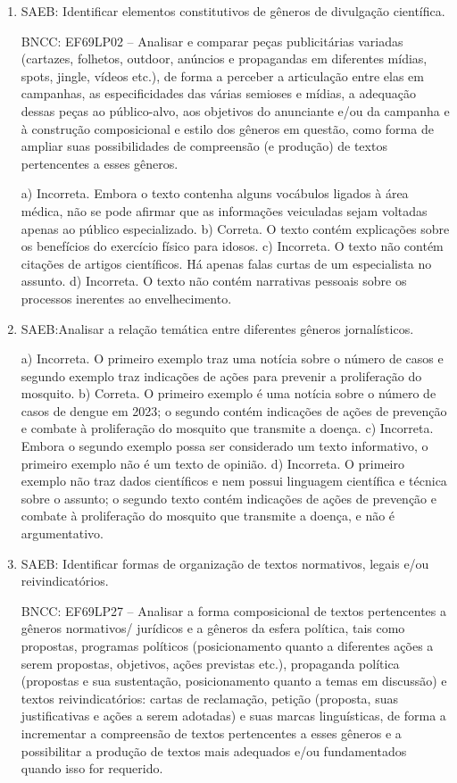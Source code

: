 \begin{enumerate}

\item
SAEB: Identificar elementos constitutivos de gêneros de divulgação
científica.

BNCC: EF69LP02 -- Analisar e comparar peças publicitárias variadas
(cartazes, folhetos, outdoor, anúncios e propagandas em diferentes
mídias, spots, jingle, vídeos etc.), de forma a perceber a articulação
entre elas em campanhas, as especificidades das várias semioses e
mídias, a adequação dessas peças ao público-alvo, aos objetivos do
anunciante e/ou da campanha e à construção composicional e estilo dos
gêneros em questão, como forma de ampliar suas possibilidades de
compreensão (e produção) de textos pertencentes a esses gêneros.

a) Incorreta. Embora o texto contenha alguns vocábulos ligados à área médica, não se pode 
afirmar que as informações veiculadas sejam voltadas apenas ao público especializado.
b) Correta. O texto contém explicações sobre os benefícios do exercício físico para idosos.
c) Incorreta. O texto não contém citações de artigos científicos. Há apenas falas curtas de um
especialista no assunto.
d) Incorreta. O texto não contém narrativas pessoais sobre os processos inerentes ao envelhecimento.

\item
SAEB:Analisar a relação temática entre diferentes gêneros jornalísticos.

a) Incorreta. O primeiro exemplo traz uma notícia sobre o número de casos
e segundo exemplo traz indicações de ações para prevenir a
proliferação do mosquito.
b) Correta. O primeiro exemplo é uma
notícia sobre o número de casos de dengue em 2023; o segundo contém
indicações de ações de prevenção e combate à proliferação do
mosquito que transmite a doença.
c) Incorreta. Embora o segundo exemplo possa ser considerado um texto
informativo, o primeiro exemplo não é um texto de opinião.
d) Incorreta. O primeiro exemplo não traz dados científicos e nem possui
linguagem científica e técnica sobre o assunto; o segundo texto contém
indicações de ações de prevenção e combate à proliferação do
mosquito que transmite a doença, e não é
argumentativo.

\item
SAEB: Identificar formas de organização de textos normativos, legais
e/ou reivindicatórios.

BNCC: EF69LP27 -- Analisar a forma composicional de textos
pertencentes a gêneros normativos/ jurídicos e a gêneros da esfera
política, tais como propostas, programas políticos (posicionamento
quanto a diferentes ações a serem propostas, objetivos, ações previstas
etc.), propaganda política (propostas e sua sustentação, posicionamento
quanto a temas em discussão) e textos reivindicatórios: cartas de
reclamação, petição (proposta, suas justificativas e ações a serem
adotadas) e suas marcas linguísticas, de forma a incrementar a
compreensão de textos pertencentes a esses gêneros e a possibilitar a
produção de textos mais adequados e/ou fundamentados quando isso for
requerido.


\end{enumerate}
